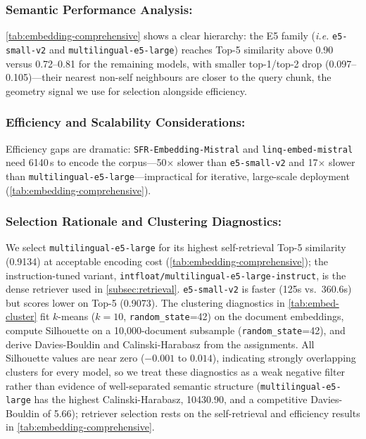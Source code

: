 \documentclass[11pt]{article}
\newcommand{\ie}{\textit{i.e. }}
\begin{document}
\subsubsection{Semantic Performance Analysis:} \cref{tab:embedding-comprehensive} shows a clear hierarchy: the E5 family (\ie \texttt{e5-small-v2} and \texttt{multilingual-e5-large}) reaches Top-5 similarity above 0.90 versus 0.72--0.81 for the remaining models, with smaller top-1/top-2 drop (0.097--0.105)---their nearest non-self neighbours are closer to the query chunk, the geometry signal we use for selection alongside efficiency.

\subsubsection{Efficiency and Scalability Considerations:} Efficiency gaps are dramatic: \texttt{SFR-Embedding-Mistral} and \texttt{linq-embed-mistral} need 6140\,s to encode the corpus---50$\times$ slower than \texttt{e5-small-v2} and 17$\times$ slower than \texttt{multilingual-e5-large}---impractical for iterative, large-scale deployment (\cref{tab:embedding-comprehensive}).

\subsubsection{Selection Rationale and Clustering Diagnostics:} We select \texttt{multilingual-e5-large} for its highest self-retrieval Top-5 similarity (0.9134) at acceptable encoding cost (\cref{tab:embedding-comprehensive}); the instruction-tuned variant, \texttt{intfloat/multilingual-e5-large-instruct}, is the dense retriever used in \cref{subsec:retrieval}. \texttt{e5-small-v2} is faster (125s vs.\ 360.6s) but scores lower on Top-5 (0.9073). The clustering diagnostics in \cref{tab:embed-cluster} fit $k$-means ($k=10$, \texttt{random\_state}=42) on the document embeddings, compute Silhouette on a 10,000-document subsample (\texttt{random\_state}=42), and derive Davies-Bouldin and Calinski-Harabasz from the assignments. All Silhouette values are near zero ($-0.001$ to $0.014$), indicating strongly overlapping clusters for every model, so we treat these diagnostics as a weak negative filter rather than evidence of well-separated semantic structure (\texttt{multilingual-e5-large} has the highest Calinski-Harabasz, 10430.90, and a competitive Davies-Bouldin of 5.66); retriever selection rests on the self-retrieval and efficiency results in \cref{tab:embedding-comprehensive}.
\end{document}
